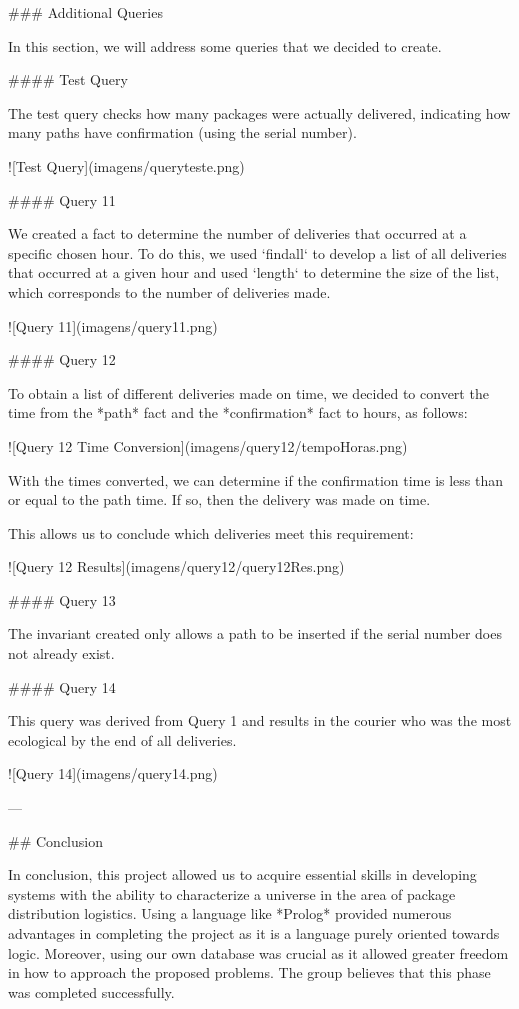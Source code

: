 ### Additional Queries

In this section, we will address some queries that we decided to create.

#### Test Query

The test query checks how many packages were actually delivered, indicating how many paths have confirmation (using the serial number).

![Test Query](imagens/queryteste.png)

#### Query 11

We created a fact to determine the number of deliveries that occurred at a specific chosen hour. To do this, we used `findall` to develop a list of all deliveries that occurred at a given hour and used `length` to determine the size of the list, which corresponds to the number of deliveries made.

![Query 11](imagens/query11.png)

#### Query 12

To obtain a list of different deliveries made on time, we decided to convert the time from the *path* fact and the *confirmation* fact to hours, as follows:

![Query 12 Time Conversion](imagens/query12/tempoHoras.png)

With the times converted, we can determine if the confirmation time is less than or equal to the path time. If so, then the delivery was made on time.

This allows us to conclude which deliveries meet this requirement:

![Query 12 Results](imagens/query12/query12Res.png)

#### Query 13

The invariant created only allows a path to be inserted if the serial number does not already exist.

#### Query 14

This query was derived from Query 1 and results in the courier who was the most ecological by the end of all deliveries.

![Query 14](imagens/query14.png)

---

## Conclusion

In conclusion, this project allowed us to acquire essential skills in developing systems with the ability to characterize a universe in the area of package distribution logistics. Using a language like *Prolog* provided numerous advantages in completing the project as it is a language purely oriented towards logic. Moreover, using our own database was crucial as it allowed greater freedom in how to approach the proposed problems. The group believes that this phase was completed successfully.
